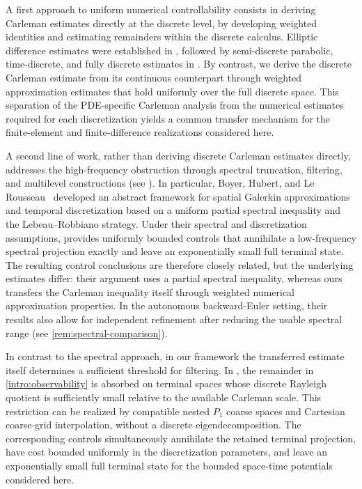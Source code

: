 \documentclass[print,wide,eng]{draft}
\begin{document}
A first approach to uniform numerical controllability consists in deriving Carleman estimates directly at the discrete level, by developing weighted identities and estimating remainders within the discrete calculus.
Elliptic difference estimates were established in \cite{Boyer2010,Boyer2010a}, followed by semi-discrete parabolic, time-discrete, and fully discrete estimates in \cite{Boyer2014,BH,GCH}.
By contrast, we derive the discrete Carleman estimate from its continuous counterpart through weighted approximation estimates that hold uniformly over the full discrete space.
This separation of the PDE-specific Carleman analysis from the numerical estimates required for each discretization yields a common transfer mechanism for the finite-element and finite-difference realizations considered here.

A second line of work, rather than deriving discrete Carleman estimates directly, addresses the high-frequency obstruction through spectral truncation, filtering, and multilevel constructions (see \cite{Zuazua2006ICM}). In particular, Boyer, Hubert, and Le Rousseau~\cite{BHLR11} developed an abstract framework for spatial Galerkin approximations and temporal discretization based on a uniform partial spectral inequality and the Lebeau--Robbiano strategy. Under their spectral and discretization assumptions,   \cite[Theorem~3.5]{BHLR11} provides uniformly bounded controls that annihilate a low-frequency spectral projection exactly and leave an exponentially small full terminal state. The resulting control conclusions are therefore closely related, but the underlying estimates differ: their argument uses a partial spectral inequality, whereas ours transfers the Carleman inequality itself through weighted numerical approximation properties. In the autonomous backward-Euler setting, their results also allow for independent refinement after reducing the usable spectral range (see \cref{rem:spectral-comparison}).

In contrast to the spectral approach, in our framework the transferred estimate itself determines a sufficient threshold for filtering. In , the remainder in \cref{intro:observability} is absorbed on terminal spaces whose discrete Rayleigh quotient is sufficiently small relative to the available Carleman scale. This restriction can be realized by compatible nested $P_1$ coarse spaces and Cartesian coarse-grid interpolation, without a discrete eigendecomposition. The corresponding controls simultaneously annihilate the retained terminal projection, have cost bounded uniformly in the discretization parameters, and leave an exponentially small full terminal state for the bounded space-time potentials considered here.
\end{document}
